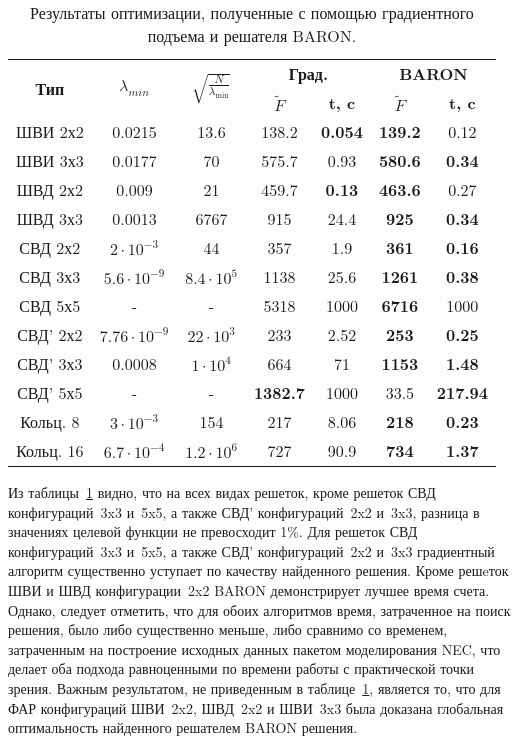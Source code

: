 \begin{table}[!h]
\centering
\begin{tabular}{|c|c|c|c c|c c|}
    \hline
    \multirow{2}{*}{\textbf{Тип}} & \multirow{2}{*}{$\lambda_{min}$} & \multirow{2}{*}{$\sqrt{\frac{N}{\lambda_{\min}}}$} & \multicolumn{2}{c}{\textbf{Град.}} & \multicolumn{2}{|c|}{\textbf{BARON}}\\
    & & & \textbf{$\tilde{F}$} & \textbf{t, c} & \textbf{$\tilde{F}$} & \textbf{t, c} \\
    \hline
    ШВИ 2х2 & 0.0215 & 13.6 & 138.2 & \textbf{0.054} & \textbf{139.2} & 0.12 \\
    ШВИ 3х3 & 0.0177 & 70 & 575.7 & 0.93 & \textbf{580.6} & \textbf{0.34} \\
    ШВД 2х2 & 0.009 & 21 & 459.7 & \textbf{0.13} & \textbf{463.6} & 0.27 \\
    ШВД 3х3 & 0.0013 & 6767 & 915 & 24.4 & \textbf{925} & \textbf{0.34}  \\
    СВД 2х2 & $2\cdot10^{-3}$ & 44& 357 & 1.9 & \textbf{361} & \textbf{0.16} \\
    СВД 3х3 & $5.6\cdot10^{-9}$ & $8.4\cdot10^{5}$& 1138 & 25.6 & \textbf{1261} & \textbf{0.38}\\
    СВД 5х5 & - & - & 5318 & 1000 & \textbf{6716} & 1000 \\
    СВД' 2х2 & $7.76\cdot10^{-9}$ & $22\cdot10^{3}$ & 233 & 2.52 & \textbf{253} & \textbf{0.25} \\
    СВД' 3х3 & 0.0008 & $1\cdot10^4$& 664 & 71 & \textbf{1153} & \textbf{1.48} \\
    СВД' 5х5 & - & - & \textbf{1382.7} & 1000 & 33.5 & \textbf{217.94}  \\
    Кольц. 8 & $3\cdot10^{-3}$ & 154 & 217 & 8.06 & \textbf{218} & \textbf{0.23} \\
    Кольц. 16 & $6.7\cdot10^{-4}$ & $1.2\cdot10^{6}$& 727 & 90.9 & \textbf{734} & \textbf{1.37} \\
    \hline
\end{tabular}
\caption{ Результаты оптимизации, полученные с помощью градиентного подъема и решателя BARON.}
\label{tab:results}
\end{table}

Из таблицы~\ref{tab:results} видно, что на всех видах решеток, кроме решеток СВД конфигураций~3x3 и~5x5, а также СВД' конфигураций~2x2 и~3x3, разница в значениях целевой функции не превосходит 1\%. Для решеток СВД конфигураций~3x3 и~5x5, а также СВД' конфигураций~2x2 и~3x3 градиентный алгоритм существенно уступает по качеству найденного решения. Кроме решeток ШВИ и ШВД конфигурации~2x2 BARON демонстрирует лучшее время счета. Однако, следует отметить, что для обоих алгоритмов время, затраченное на поиск решения, было либо существенно меньше, либо сравнимо со временем, затраченным на построение исходных данных пакетом моделирования NEC, что делает оба подхода равноценными по времени работы с практической точки зрения. Важным результатом, не приведенным в таблице~\ref{tab:results}, является то, что для ФАР конфигураций ШВИ~2x2, ШВД~2x2 и ШВИ~3x3 была доказана глобальная оптимальность найденного решателем BARON решения.

